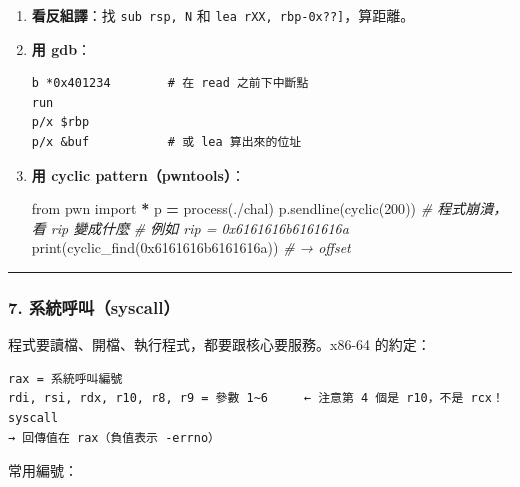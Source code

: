 \documentclass[10pt,a4paper]{article}
\newenvironment{Shaded}{\begin{snugshade}}{\end{snugshade}}
\newcommand{\BaseNTok}[1]{\textcolor[rgb]{0.00,0.00,0.81}{#1}}
\newcommand{\BuiltInTok}[1]{#1}
\newcommand{\CommentTok}[1]{\textcolor[rgb]{0.56,0.35,0.01}{\textit{#1}}}
\newcommand{\DecValTok}[1]{\textcolor[rgb]{0.00,0.00,0.81}{#1}}
\newcommand{\ImportTok}[1]{#1}
\newcommand{\NormalTok}[1]{#1}
\newcommand{\OperatorTok}[1]{\textcolor[rgb]{0.81,0.36,0.00}{\textbf{#1}}}
\newcommand{\StringTok}[1]{\textcolor[rgb]{0.31,0.60,0.02}{#1}}
\renewenvironment{Shaded}{%
  \def\FrameCommand{\fboxsep=3.2pt\colorbox{shadecolor}}%
  \MakeFramed{\advance\hsize-\width\FrameRestore\small}%
}{%
  \endMakeFramed
}
\begin{document}
\begin{enumerate}
\def\labelenumi{\arabic{enumi}.}
\item
  \textbf{看反組譯}：找 \texttt{sub\ \allowbreak{}rsp,\allowbreak{}\ \allowbreak{}N} 和
  \texttt{lea\ \allowbreak{}rXX,\allowbreak{}\ \allowbreak{}{[}rbp-\allowbreak{}0x??{]}}，算距離。
\item
  \textbf{用 gdb}：

\begin{Verbatim}[breaklines=true,breakanywhere=true,breakautoindent=false,fontsize=\fontsize{7.0}{9.5}\selectfont]
b *0x401234        # 在 read 之前下中斷點
run
p/x $rbp
p/x &buf           # 或 lea 算出來的位址
\end{Verbatim}
\item
  \textbf{用 cyclic pattern（pwntools）}：

\begin{Shaded}
\begin{Highlighting}[]
\ImportTok{from}\NormalTok{ pwn }\ImportTok{import} \OperatorTok{*}
\NormalTok{p }\OperatorTok{=}\NormalTok{ process(}\StringTok{\textquotesingle{}./chal\textquotesingle{}}\NormalTok{)}
\NormalTok{p.sendline(cyclic(}\DecValTok{200}\NormalTok{))}
\CommentTok{\# 程式崩潰，看 rip 變成什麼}
\CommentTok{\# 例如 rip = 0x6161616b6161616a}
\BuiltInTok{print}\NormalTok{(cyclic\_find(}\BaseNTok{0x6161616b6161616a}\NormalTok{))   }\CommentTok{\# → offset}
\end{Highlighting}
\end{Shaded}
\end{enumerate}

\begin{center}\rule{0.5\linewidth}{0.5pt}\end{center}

\subsubsection{7.
系統呼叫（syscall）}\label{ux7cfbux7d71ux547cux53ebsyscall}

程式要讀檔、開檔、執行程式，都要跟核心要服務。x86-64 的約定：

\begin{Verbatim}[breaklines=true,breakanywhere=true,breakautoindent=false,fontsize=\fontsize{7.0}{9.5}\selectfont]
rax = 系統呼叫編號
rdi, rsi, rdx, r10, r8, r9 = 參數 1~6     ← 注意第 4 個是 r10，不是 rcx！
syscall
→ 回傳值在 rax（負值表示 -errno）
\end{Verbatim}

常用編號：
\end{document}
